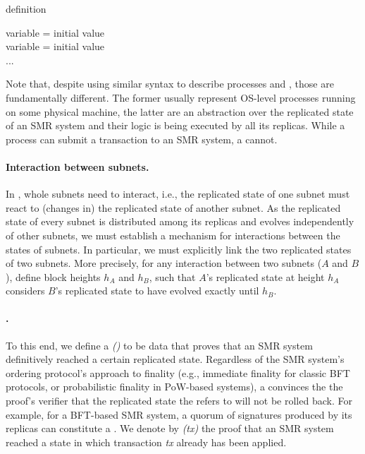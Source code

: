 \begin{algorithm}[H]
\footnotesize
\caption{\dapp definition}\label{alg:dapp-definition}
  \DontPrintSemicolon
  variable = initial value\\
  variable = initial value\\
  ...\\
\end{algorithm}
Note that, despite using similar syntax to describe processes and \dapps, those are fundamentally different.
The former usually represent OS-level processes running on some physical machine,
the latter are an abstraction over the replicated state of an SMR system and their logic is being executed by all its replicas.
While a process can submit a transaction to an SMR system, a \dapp cannot.

\paragraph{Interaction between subnets.}
In \ipc, whole subnets need to interact, i.e., the replicated state of one subnet must react to (changes in) the replicated state of another subnet.
As the replicated state of every subnet is distributed among its replicas and evolves independently of other subnets,
we must establish a mechanism for interactions between the states of subnets.
In particular, we must explicitly link the two replicated states of two subnets.
More precisely, for any interaction between two subnets ($A$ and $B$), define block heights $h_A$ and $h_B$,
such that $A$'s replicated state at height $h_A$ considers $B$'s replicated state to have evolved exactly until $h_B$.

\paragraph{\PofsFull.}To this end, we define a \emph{\pofFull (\pof)} to be data that proves that an SMR system definitively reached a certain replicated state.
Regardless of the SMR system's ordering protocol's approach to finality (e.g., immediate finality for classic BFT protocols, or probabilistic finality in PoW-based systems),
a \pof convinces the the proof's verifier that the replicated state the \pof refers to will not be rolled back.
For example, for a BFT-based SMR system, a quorum of signatures produced by its replicas can constitute a \pof.
We denote by \emph{\pof(tx)} the proof that an SMR system reached a state in which transaction \emph{tx} already has been applied.



